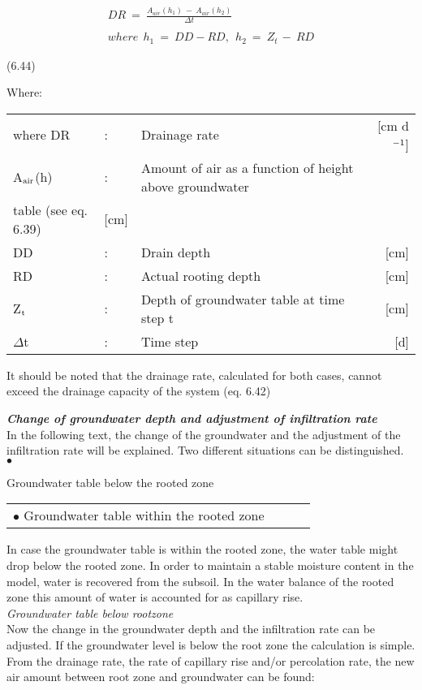 \begin{eqnarray*}
DR ~=~{\frac{A _{air} (h _{1} )~-~ A _{air} (h _{2} )}{\Delta t}} \nonumber  \\
\, \nonumber  \\
where ~~h _{1} ~=~DD -RD,~~h _{2} ~=~Z _{t~} -~RD
\end{eqnarray*}

 
\strut\hfill (6.44)



Where:\\
\begin{tabularx}{\textwidth}{llXr}



where DR &:& Drainage rate  & [cm d$^{{\rm -1}}$]\\
A$_{{\rm air}}$(h) &:& Amount of air as a function of height above groundwater \\
   table  (see eq. 6.39) & [cm]\\
DD &:& Drain depth  & [cm]\\
RD &:& Actual rooting depth  & [cm]\\
Z$_{{\rm t}}$ &:& Depth of groundwater table at time step t  & [cm]\\
$\Delta$t &:& Time step  & [d]
\end{tabularx}


It should be noted that the drainage rate, calculated for both cases, cannot exceed the
drainage capacity of the system (eq. 6.42)



{\bf {\it Change of groundwater depth and adjustment of infiltration rate\/}}\\
In the following text, the change of the groundwater and the adjustment of the infiltration
rate will be explained. Two different situations can be distinguished.\\
$\bullet$
\testlastline

\begin{indenting}{1.27cm}
Groundwater table below the rooted zone
\end{indenting}
\begin{tabularx}{\textwidth}{llXr}



$\bullet$ Groundwater table within the rooted zone
\end{tabularx}
In case the groundwater table is within the rooted zone, the water table might drop below
the rooted zone. In order to maintain a stable moisture content in the model, water is
recovered from the subsoil. In the water balance of the rooted zone this amount of water
is accounted for as capillary rise.\\
 {\it Groundwater table below rootzone\/}\\
Now the change in the groundwater depth and the infiltration rate can be adjusted. If the
groundwater level is below the root zone the calculation is simple. From the drainage
rate, the rate of capillary rise and/or percolation rate, the new air amount between root
zone and groundwater can be found:

